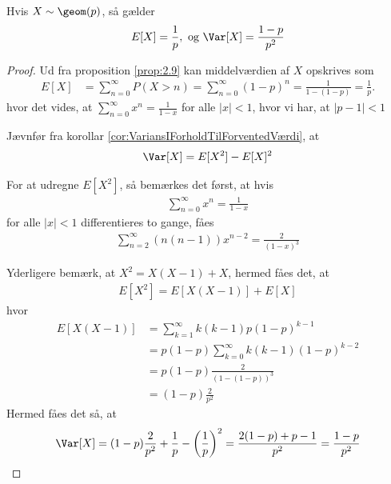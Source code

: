 \begin{prop} %
\label{prop:geomEgenskaber}
Hvis $X \sim \geom (p)$, så gælder 
\begin{align*}
    E[X] = \frac{1}{p}, \text{ og } \Var[X] = \frac{1-p}{p^2}
\end{align*}
\end{prop}

\begin{proof}
Ud fra proposition \ref{prop:2.9} kan middelværdien af $X$ opskrives som
\begin{align*}
  E[X] &= \sum_{n=0}^{\infty} P(X > n) =\sum_{n=0}^\infty(1-p)^n=\frac{1}{1-(1-p)}=\frac{1}{p}.
\end{align*}
hvor det vides, at $\sum_{n=0}^\infty x^n=\frac{1}{1-x}$ for alle $|x|<1$, hvor vi har, at $|p-1|<1$

Jævnfør fra korollar \ref{cor:VariansIForholdTilForventedVærdi}, at
\begin{align*}
    \Var[X] =E[X^2]-E[X]^2
\end{align*}

For at udregne $E[X^2]$, så bemærkes det først, at hvis
\begin{align*}
    \sum^\infty_{n=0}x^n=\frac{1}{1-x}
\end{align*}
for alle $|x|<1$ differentieres to gange, fåes 
\begin{align*}
    \sum^\infty_{n=2}(n(n-1))x^{n-2}=\frac{2}{(1-x)^3}
\end{align*}

Yderligere bemærk, at $X^2=X(X-1)+X$, hermed fåes det, at
\begin{align*}
    E[X^2]=E[X(X-1)]+E[X]
\end{align*}
hvor 
\begin{align*}
    E[X(X-1)]&= \sum_{k=1}^{\infty}k(k-1)p(1-p)^{k-1}\\
    &= p(1-p)\sum_{k=0}^{\infty}k(k-1)(1-p)^{k-2}\\
    &=p(1-p)\frac{2}{(1-(1-p))^3}
    \\
    &=(1-p)\frac{2}{p^2}
\end{align*}
Hermed fåes det så, at
\begin{align*}
    \Var[X]=(1-p)\frac{2}{p^2}+\frac{1}{p}-\left(\frac{1}{p}\right)^2
    =\frac{2(1-p)+p-1}{p^2}
    =\frac{1-p}{p^2}
\end{align*}


\end{proof}
